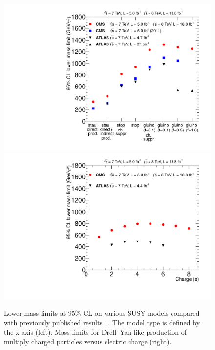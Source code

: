 \begin{figure}
 \begin{center}
  \includegraphics[clip=true, trim=0.0cm 0cm 1.0cm 0cm, width=0.44\linewidth]{figures/hscp_resultsNov2012}
  \includegraphics[clip=true, trim=0.0cm 0cm 1.0cm 0cm, width=0.44\linewidth]{figures/DYhscp_resultsNov2012}
 \end{center}
 \caption[Lower mass limits on HSCP produced in various models of new physics compared with previously published results]
{Lower mass limits at 95\% CL on various SUSY models compared with previously published results
~\cite{Aad:2011hz, Aad:2011yf, Aad:2011mb,Aad:2012vd, ATLASmCHAMPs, Khachatryan:2011ts, Chatrchyan:2012sp}. 
The model type is defined by the x-axis (left). 
Mass limits for Drell--Yan like production of multiply charged particles versus electric charge (right).}
   \label{fig:masslimits}
\end{figure}